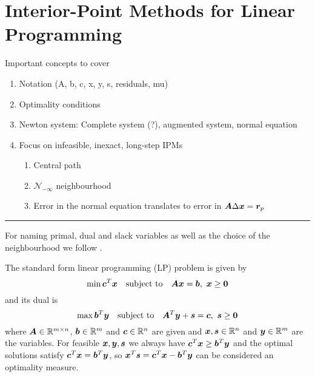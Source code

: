 \chapter{Interior-Point Methods for Linear Programming} \label{chap:ipm}

Important concepts to cover
\begin{enumerate}
 \item Notation (A, b, c, x, y, s, residuals, mu)
 \item Optimality conditions
 \item Newton system: Complete system (?), augmented system, normal equation
 \item Focus on infeasible, inexact, long-step IPMs
 \begin{enumerate}
   \item Central path
   \item \(\mathcal{N}_{-\infty}\) neighbourhood
   \item Error in the normal equation translates to error in \(\bm{A}\Delta\bm{x} = \bm{r}_p\)
 \end{enumerate}
\end{enumerate}

\hrule

For naming primal, dual and slack variables as well as the choice of the neighbourhood we follow \cite{Monteiro-ConvergenceAnalysisLongStepInfeasibleIPMs}.

The standard form linear programming (LP) problem is given by
\begin{equation}
 \min \bm{c}^T \bm{x} \quad \text{subject to} \quad \bm{A}\bm{x} = \bm{b}, \ \bm{x} \geq \bm{0}
\end{equation}
and its dual is
\begin{equation}
  \max \bm{b}^T \bm{y} \quad \text{subject to} \quad \bm{A}^T \bm{y} + \bm{s} = \bm{c}, \ \bm{s} \geq \bm{0}
\end{equation}
where \(\bm{A} \in \mathbb{R}^{m \times n}\), \(\bm{b} \in \mathbb{R}^m\) and \(\bm{c} \in \mathbb{R}^n\) are given and \(\bm{x}, \bm{s} \in \mathbb{R}^n\) and \(\bm{y} \in \mathbb{R}^m\) are the variables.
For feasible \(\bm{x}, \bm{y}, \bm{s}\) we always have \(\bm{c}^T \bm{x} \geq \bm{b}^T \bm{y}\) and the optimal solutions satisfy \(\bm{c}^T \bm{x} = \bm{b}^T \bm{y}\), so \(\bm{x}^T \bm{s} = \bm{c}^T \bm{x} - \bm{b}^T \bm{y}\) can be considered an optimality measure.

